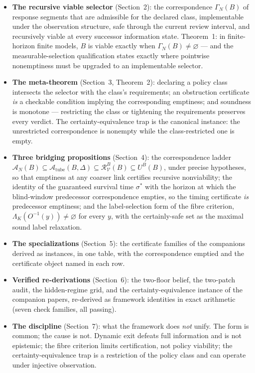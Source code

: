 \documentclass[10pt,twocolumn]{article}
\theoremstyle{definition}
\providecommand{\tightlist}{\setlength{\itemsep}{0pt}\setlength{\parskip}{0pt}}
\begin{document}
\begin{itemize}\tightlist
\item \textbf{The recursive viable selector} (Section~2): the correspondence
\(\Gamma_{N}(B)\) of response segments that are admissible for the declared
class, implementable under the observation structure, safe through the
current review interval, and recursively viable at every successor
information state. Theorem~1: in finite-horizon finite models,
\(B\) is viable exactly when \(\Gamma_{N}(B) \neq \varnothing\) --- and the
measurable-selection qualification states exactly where pointwise
nonemptiness must be upgraded to an implementable selector.
\item \textbf{The meta-theorem} (Section~3, Theorem~2): declaring a policy
class intersects the selector with the class's requirements; an obstruction
certificate \emph{is} a checkable condition implying the corresponding
emptiness; and soundness is monotone --- restricting the class or tightening
the requirements preserves every verdict. The certainty-equivalence trap is
the canonical instance: the unrestricted correspondence is nonempty while the
class-restricted one is empty.
\item \textbf{Three bridging propositions} (Section~4): the correspondence
ladder
\(\mathcal{A}_{N}(B) \subseteq \mathcal{A}_{\mathrm{tube}}(B,\Delta)
\subseteq \mathcal{R}^{B}_{\mathcal{V}}(B) \subseteq U^{B}(B)\), under
precise hypotheses, so that emptiness at any coarser link certifies
recursive nonviability; the identity of the guaranteed survival time
\(\sigma^{*}\) with the horizon at which the blind-window predecessor
correspondence empties, so the timing certificate \emph{is} predecessor
emptiness; and the label-selection form of the fibre criterion,
\(\Lambda_{K}(O^{-1}(y)) \neq \varnothing\) for every \(y\), with the
certainly-safe set as the maximal sound label relaxation.
\item \textbf{The specializations} (Section~5): the certificate families of
the companions derived as instances, in one table, with the correspondence
emptied and the certificate object named in each row.
\item \textbf{Verified re-derivations} (Section~6): the two-floor belief, the
two-patch audit, the hidden-regime grid, and the certainty-equivalence
instance of the companion papers, re-derived as framework identities in
exact arithmetic (seven check families, all passing).
\item \textbf{The discipline} (Section~7): what the framework does
\emph{not} unify. The form is common; the cause is not. Dynamic exit defeats
full information and is not epistemic; the fibre criterion limits
certification, not policy viability; the certainty-equivalence trap is a
restriction of the policy class and can operate under injective observation.
\end{itemize}
\end{document}
